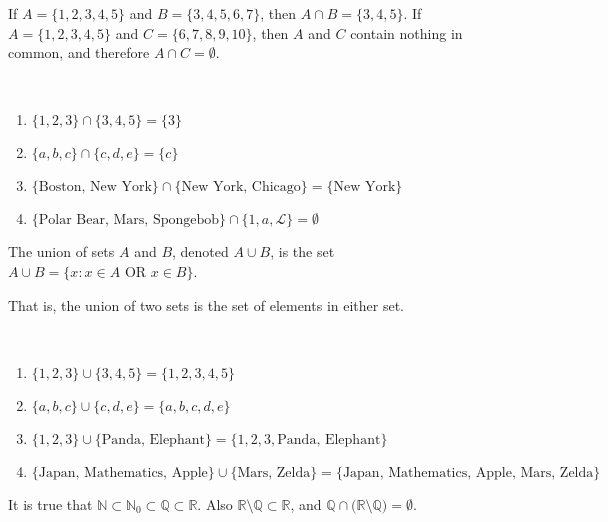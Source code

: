 \documentclass[crop=false,class=book,oneside]{standalone}
\begin{document}
        \begin{example}
            If $A=\{1,2,3,4,5\}$ and $B=\{3,4,5,6,7\}$,
            then $A\cap{B}=\{3,4,5\}$. If $A=\{1,2,3,4,5\}$ and
            $C=\{6,7,8,9,10\}$, then $A$ and $C$ contain nothing in common,
            and therefore $A\cap{C}=\emptyset$.
        \end{example}
        \begin{example}
            \
            \begin{enumerate}
                \item $\{1,2,3\}\cap\{3,4,5\}=\{3\}$
                \item $\{a,b,c\}\cap\{c,d,e\}=\{c\}$
                \item $\{\textrm{Boston, New York}\}\cap%
                       \{\textrm{New York, Chicago}\}=\{\textrm{New York}\}$
                \item $\{\textrm{Polar Bear, Mars, Spongebob}\}%
                       \cap\{1,a,\mathcal{L}\}=\emptyset$
            \end{enumerate}
        \end{example}
        \begin{definition}
            The union of sets $A$ and $B$, denoted $A\cup{B}$, is the
            set $A\cup{B}=\{x:x\in{A}\textrm{ OR }x\in{B}\}$.
        \end{definition}
        \begin{remark}
            That is, the union of two sets is the set of
            elements in either set.
        \end{remark}
        \begin{example}
            \
            \begin{enumerate}
                \item $\{1,2,3\}\cup\{3,4,5\}=\{1,2,3,4,5\}$
                \item $\{a,b,c\}\cup\{c,d,e\}=\{a,b,c,d,e\}$
                \item $\{1,2,3\}\cup\{\textrm{Panda, Elephant}\}%
                       =\{1,2,3,\textrm{Panda, Elephant}\}$
                \item $\{\textrm{Japan, Mathematics, Apple}\}\cup%
                       \{\textrm{Mars, Zelda}\}%
                       =\{\textrm{Japan, Mathematics, Apple, Mars, Zelda}\}$
            \end{enumerate}
        \end{example}
        \begin{remark}
            It is true that
            $\mathbb{N}\subset\mathbb{N}_{0}\subset\mathbb{Q}\subset\mathbb{R}$.
            Also $\mathbb{R}\setminus\mathbb{Q}\subset\mathbb{R}$, and
            $\mathbb{Q}\cap\big(\mathbb{R}\setminus\mathbb{Q}\big)=\emptyset$.
        \end{remark}
\end{document}

